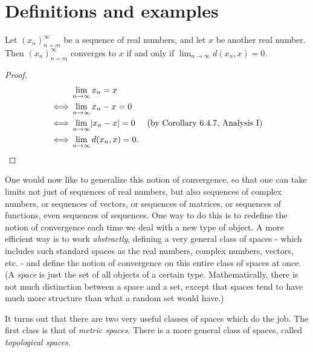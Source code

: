 \section{Definitions and examples}\label{sec 1.1}

\begin{lemma}\label{1.1.1}
    Let \((x_n)_{n = m}^\infty\) be a sequence of real numbers, and let \(x\) be another real number.
    Then \((x_n)_{n = m}^\infty\) converges to \(x\) if and only if \(\lim_{n \to \infty} d(x_n, x) = 0\).
\end{lemma}

\begin{proof}
    \begin{align*}
             & \lim_{n \to \infty} x_n = x                                                      \\
        \iff & \lim_{n \to \infty} x_n - x = 0                                                  \\
        \iff & \lim_{n \to \infty} \abs*{x_n - x} = 0 & \text{(by Corollary 6.4.7, Analysis I)} \\
        \iff & \lim_{n \to \infty} d(x_n, x) = 0.
    \end{align*}
\end{proof}

\begin{note}
    One would now like to generalize this notion of convergence, so that one can take limits not just of sequences of real numbers, but also sequences of complex numbers, or sequences of vectors, or sequences of matrices, or sequences of functions, even sequences of sequences.
    One way to do this is to redefine the notion of convergence each time we deal with a new type of object.
    A more efficient way is to work \emph{abstractly}, defining a very general class of spaces - which includes such standard spaces as the real numbers, complex numbers, vectors, etc. - and define the notion of convergence on this entire class of spaces at once.
    (A \emph{space} is just the set of all objects of a certain type.
    Mathematically, there is not much distinction between a space and a set, except that spaces tend to have much more structure than what a random set would have.)
\end{note}

\begin{note}
    It turns out that there are two very useful classes of spaces which do the job.
    The first class is that of \emph{metric spaces}.
    There is a more general class of spaces, called \emph{topological spaces}.
\end{note}

